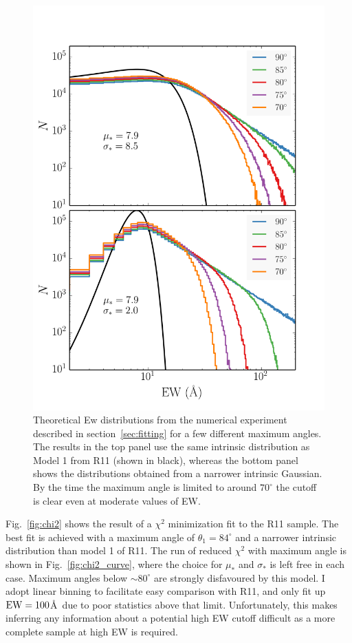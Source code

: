 \begin{figure}
\centering
\includegraphics[width=1.0\textwidth]{figures/ewpaper/cutoff.png}
\caption
{
Theoretical Ew distributions from the numerical experiment 
described in section~\ref{sec:fitting} for a few different 
maximum angles. The results in the top panel use the same intrinsic
distribution as Model 1 from R11 (shown in black), 
whereas the bottom panel shows the distributions 
obtained from a narrower intrinsic Gaussian. By the time the maximum
angle is limited to around $70^\circ$ the cutoff is
clear even at moderate values of EW.
}
\label{fig:cutoff}
\end{figure}

Fig.~\ref{fig:chi2} shows the result of a $\chi^2$ minimization fit 
to the R11 sample. The best fit is achieved with a maximum angle of 
$\theta_{1}=84^\circ$ and a narrower intrinsic distribution
than model 1 of R11. The run of reduced $\chi^2$ with maximum angle
is shown in Fig.~\ref{fig:chi2_curve}, where the choice for $\mu_*$
and $\sigma_*$ is left free in each case. 
Maximum angles below $\sim80^\circ$ are strongly disfavoured
by this model. I adopt linear binning to facilitate easy comparison 
with R11, and only fit up ${\rm EW}=100$\AA\
due to poor statistics above that limit. Unfortunately, this 
makes inferring any information about a potential high EW cutoff 
difficult as a more complete sample at high EW is required. 

